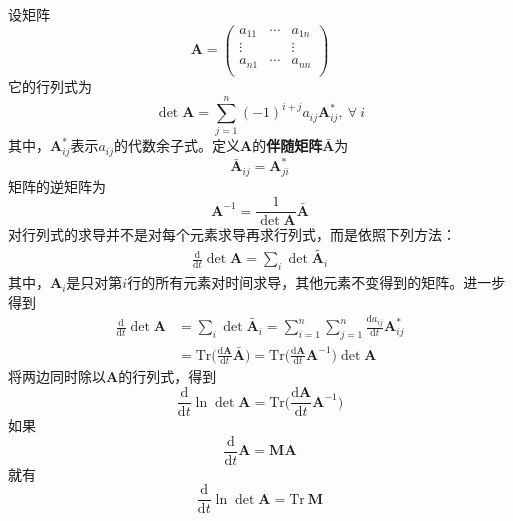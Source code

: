 \documentclass[12pt]{article}
\begin{document}
    设矩阵
    \begin{equation*}
        \bm{A} = 
        \begin{pmatrix}
            a_{11} & \cdots & a_{1n}\\
            \vdots & & \vdots\\
            a_{n1} & \cdots & a_{nn}\\
            \end{pmatrix}
    \end{equation*}
    它的行列式为
    \begin{equation*}
        \det{\bm{A}} = \sum_{j=1}^n (-1)^{i+j} a_{ij} \bm{A}_{ij}^*, \ \forall \ i
    \end{equation*}
    其中，$\bm{A}_{ij}^*$表示$a_{ij}$的代数余子式。定义$\bm{A}$的\textbf{伴随矩阵}$\bar{\bm{A}}$为
    \begin{equation*}
        \bar{\bm{A}}_{ij} = \bm{A}_{ji}^* 
    \end{equation*}
    矩阵的逆矩阵为
    \begin{equation*}
        \bm{A}^{-1} = \frac 1{\det{\bm{A}}} \bm{\bar{A}}
    \end{equation*}
    对行列式的求导并不是对每个元素求导再求行列式，而是依照下列方法：
    \begin{align*}
        \frac {\mathrm{d}}{\mathrm{d}t} \det{\bm{A}} = \sum_i \det{\tilde{\bm{A}_i}}
    \end{align*}
    其中，$\bm{A}_i$是只对第$i$行的所有元素对时间求导，其他元素不变得到的矩阵。进一步得到
    \begin{align*}
        \frac {\mathrm{d}}{\mathrm{d}t} \det{\bm{A}} &= \sum_i \det{\tilde{\bm{A}_i}} = \sum_{i=1}^n \sum_{j=1}^n \frac {\mathrm{d}a_{ij}}{\mathrm{d}t} \bm{A}_{ij}^*\\
        &= \mathrm{Tr} \bigg(\frac {\mathrm{d}\bm{A}}{\mathrm{d}t} \bar{\bm{A}}\bigg) = \mathrm{Tr} \bigg(\frac {\mathrm{d}\bm{A}}{\mathrm{d}t} \bm{A}^{-1}\bigg) \det{\bm{A}}
    \end{align*}
    将两边同时除以$\bm{A}$的行列式，得到
    \begin{equation*}
        \frac {\mathrm{d}}{\mathrm{d}t} \ln{\det{\bm{A}}} = \mathrm{Tr} \bigg(\frac {\mathrm{d}\bm{A}}{\mathrm{d}t} \bm{A}^{-1}\bigg)
    \end{equation*}
    如果
    \begin{equation*}
        \frac {\mathrm{d}}{\mathrm{d}t} \bm{A} = \bm{MA}
    \end{equation*}
    就有
    \begin{equation*}
        \frac {\mathrm{d}}{\mathrm{d}t} \ln{\det{\bm{A}}} = \mathrm{Tr}\ \bm{M}
    \end{equation*}
\end{document}
